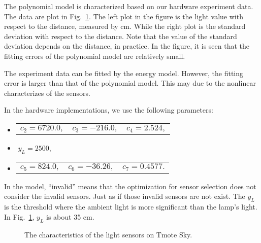 \begin{remark}
The polynomial model is characterized based on our hardware experiment data. The data are plot in Fig.~\ref{f:SensorFit}. The left plot in the figure is the light value with respect to the distance, measured by cm. While the right plot is the standard deviation with respect to the distance. Note that the value of the standard deviation depends on the distance, in practice. In the figure, it is seen that the fitting errors of the polynomial model are relatively small.

The experiment data can be fitted by the energy model. However, the fitting error is larger than that of the polynomial model. This may due to the nonlinear characterizes of the sensors.

In the hardware implementations, we use the following parameters:
\begin{itemize}
  \item \begin{tabular}{ccc}
          $c_2=6720.0,$ & $c_3=-216.0,$ & $c_4=2.524,$ \\
        \end{tabular}
  \item $\; y_L=2500$,
  \item \begin{tabular}{ccc}
          $c_5=824.0,$ & $c_6=-36.26,$ & $c_7=0.4577.$ \\
        \end{tabular}
\end{itemize}

In the model, ``invalid'' means that the optimization for sensor selection does not consider the invalid sensors. Just as if those invalid sensors are not exist. The $y_L$ is the threshold where the ambient light is more significant than the lamp's light. In Fig.~\ref{f:SensorFit}, $y_L$ is about 35 cm.
\end{remark}

\begin{figure}
  \centering
  \caption{The characteristics of the light sensors on Tmote Sky.}\label{f:SensorFit}
\end{figure}


